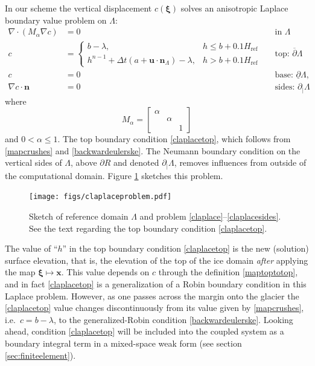 \documentclass[letterpaper,final,12pt,reqno]{amsart}
\newcommand{\grad}{\nabla}
\newcommand{\Div}{\nabla\cdot}
\newcommand{\bn}{\mathbf{n}}
\newcommand{\bu}{\mathbf{u}}
\newcommand{\bx}{\mathbf{x}}
\newcommand{\bxi}{\bm{\xi}}
\newcommand{\Href}{H_{\text{ref}}}
\begin{document}
In our scheme the vertical displacement $c(\bxi)$ solves an anisotropic Laplace boundary value problem on $\Lambda$:
\begin{align}
        \Div(M_\alpha \grad c) &= 0 &&\text{in } \Lambda \label{claplace} \\
                c &= \begin{cases} b-\lambda, & h \le b + 0.1\Href \\
                                   h^{n-1} + \Delta t\left(a + \bu \cdot \bn_\Lambda\right) - \lambda, & h>b+0.1\Href \end{cases} &&\text{top: } \overline{\partial} \Lambda  \label{claplacetop} \\
                c &= 0 &&\text{base: } \underline{\partial} \Lambda,  \label{claplacebase} \\
 \grad c\cdot \bn &= 0 &&\text{sides: } \partial_{|} \Lambda  \label{claplacesides}
\end{align}
where
    $$M_\alpha = \begin{bmatrix} \alpha & & \\ & \alpha & \\ & & 1 \end{bmatrix}$$
and $0<\alpha\le 1$.  The top boundary condition \eqref{claplacetop}, which follows from \eqref{mapcrushes} and \eqref{backwardeulerske}.  The Neumann boundary condition on the vertical sides of $\Lambda$, above $\partial R$ and denoted $\partial_{|} \Lambda$, removes influences from outside of the computational domain.  Figure \ref{fig:claplaceproblem} sketches this problem.

\begin{figure}[ht]
\begin{center}
\texttt{[image: figs/claplaceproblem.pdf]}
\end{center}
\caption{Sketch of reference domain $\Lambda$ and problem \eqref{claplace}--\eqref{claplacesides}.  See the text regarding the top boundary condition \eqref{claplacetop}.}
\label{fig:claplaceproblem}
\end{figure}

The value of ``$h$'' in the top boundary condition \eqref{claplacetop} is the new (solution) surface elevation, that is, the elevation of the top of the ice domain \emph{after} applying the map $\bxi\mapsto \bx$.  This value depends on $c$ through the definition \eqref{maptoptotop}, and in fact \eqref{claplacetop} is a generalization of a Robin boundary condition in this Laplace problem.  However, as one passes across the margin onto the glacier the \eqref{claplacetop} value changes discontinuously from its value given by \eqref{mapcrushes}, i.e.~$c=b-\lambda$, to the generalized-Robin condition \eqref{backwardeulerske}.  Looking ahead, condition \eqref{claplacetop} will be included into the coupled system as a boundary integral term in a mixed-space weak form (see section \ref{sec:finiteelement}).
\end{document}
